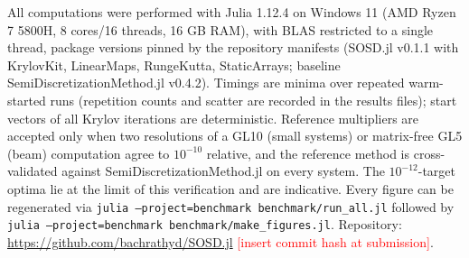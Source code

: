 \documentclass[Afour,sageh,times]{sagej}
\newcommand{\TODOnum}[1]{\textcolor{red}{[#1]}}
\begin{document}
All computations were performed with Julia 1.12.4 on Windows 11 (AMD Ryzen 7
5800H, 8 cores/16 threads, 16 GB RAM),
with BLAS restricted to a single thread, package versions pinned by the repository manifests
(\textsf{SOSD.jl} v0.1.1 with KrylovKit, LinearMaps, RungeKutta, StaticArrays;
baseline \textsf{SemiDiscretizationMethod.jl} v0.4.2). Timings are minima
over repeated warm-started runs (repetition counts and scatter are recorded
in the results files); start
vectors of all Krylov iterations are deterministic. Reference multipliers are
accepted only when two resolutions of a GL10 (small systems) or matrix-free
GL5 (beam) computation agree to $10^{-10}$ relative, and the reference method is
cross-validated against \textsf{SemiDiscretizationMethod.jl} on every system.
The $10^{-12}$-target optima lie at the limit of this verification and are
indicative.
Every figure can be regenerated via
\texttt{julia --project=benchmark benchmark/run\_all.jl} followed by
\texttt{julia --project=benchmark benchmark/make\_figures.jl}. Repository:
\url{https://github.com/bachrathyd/SOSD.jl}
\TODOnum{insert commit hash at submission}.



\end{document}
